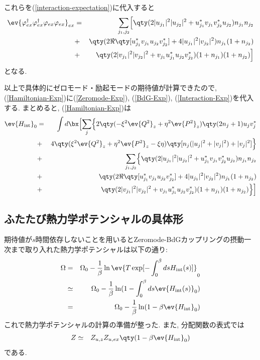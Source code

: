 \documentclass[10.5pt,a4paper]{jreport}
\begin{document}
これらを(\ref{interaction-expectation})に代入すると
\begin{eqnarray}
  \nonumber \ev{\varphi_{ex}^\dagger\varphi_{ex}^\dagger\varphi_{ex}\varphi_{ex}}_{ex} &=& \sum_{j_1, j_2}\Bigl[\qty(2|u_{j_1}|^2|u_{j_2}|^2 + u_{j_1}^*v_{j_1}v_{j_2}^*u_{j_2})n_{j_1}n_{j_2}\\
    \nonumber  &+& \qty(2\Re\qty[u_{j_1}^*v_{j_1}u_{j_2}v_{j_2}^*] + 4|u_{j_1}|^2|v_{j_2}|^2)n_{j_1}(1+n_{j_2})\\ &+& \qty(2|v_{j_1}|^2|v_{j_2}|^2 + v_{j_1}u_{j_1}^*u_{j_2}v_{j_2}^*)(1+n_{j_1})(1+n_{j_2})\Bigr]\label{Interaction-Exp}
\end{eqnarray}
となる. 

以上で具体的にゼロモード・励起モードの期待値が計算できたので, (\ref{Hamiltonian-Exp})に(\ref{Zeromode-Exp}), (\ref{BdG-Exp}), (\ref{Interaction-Exp})を代入する. まとめると, (\ref{Hamiltonian-Exp})は
\begin{eqnarray}
  \nonumber  \ev{H_{\rm int}}_0 &=& \int d\bx\Bigl[\sum_j\Bigl\{2\qty(-\xi^2\ev{Q^2}_z + \eta^2\ev{P^2}_z)\qty(2n_j + 1)u_jv_j^*\\
    &+& 4\qty(\xi^2\ev{Q^2}_z + \eta^2\ev{P^2}_z - \xi\eta)\qty[n_j(|u_j|^2 + |v_j|^2) + |v_j|^2] \Bigr\}\\
    &+& \sum_{j_1, j_2}\Bigl\{\qty(2|u_{j_1}|^2|u_{j_2}|^2 + u_{j_1}^*v_{j_1}v_{j_2}^*u_{j_2})n_{j_1}n_{j_2}\\
    \nonumber  &+& \qty(2\Re\qty[u_{j_1}^*v_{j_1}u_{j_2}v_{j_2}^*] + 4|u_{j_1}|^2|v_{j_2}|^2)n_{j_1}(1+n_{j_2})\\ &+& \qty(2|v_{j_1}|^2|v_{j_2}|^2 + v_{j_1}u_{j_1}^*u_{j_2}v_{j_2}^*)(1+n_{j_1})(1+n_{j_2})\Bigr\}\Bigr]
\end{eqnarray}
\subsection{ふたたび熱力学ポテンシャルの具体形}
期待値が$s$時間依存しないことを用いるとZeromode-BdGカップリングの摂動一次まで取り入れた熱力学ポテンシャルは以下の通り:
\begin{eqnarray}
  \Omega &=& \Omega_0 -\frac{1}{\beta}\ln\ev{T\exp[-\int_0^\beta ds H_{\rm int}(s)]}_0\\
  &\simeq& \Omega_0 - \frac{1}{\beta}\ln(1 - \int_0^\beta ds\ev{H_{\rm int}(s)}_0)\\
  &=& \Omega_0 - \frac{1}{\beta}\ln(1 - \beta\ev{H_{\rm int}}_0)
\end{eqnarray}
これで熱力学ポテンシャルの計算の準備が整った. また, 分配関数の表式では
\begin{eqnarray}
  Z &\simeq& Z_{u, z}Z_{u, ex}\qty(1 - \beta\ev{H_{\rm int}}_0)
\end{eqnarray}
である.
\end{document}
